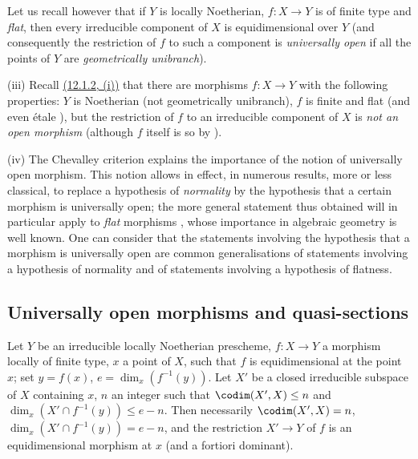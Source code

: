 \begin{remarks}[14.4.10]
Let us recall however  that if $Y$ is locally Noetherian, $f:X\to Y$ is of finite type and \emph{flat}, then every irreducible component of $X$ is equidimensional over $Y$ (and consequently the restriction of $f$ to such a component is \emph{universally open} if all the points of $Y$ are \emph{geometrically unibranch}).

(iii) Recall {\hyperlink{ega4.c04.item.12-1-2}{(12.1.2, (i))}} that there are morphisms $f:X\to Y$ with the following properties: $Y$ is Noetherian (not geometrically unibranch), $f$ is finite and flat (and even \'etale ), but the restriction of $f$ to an irreducible component of $X$ is \emph{not an open morphism} (although $f$ itself is so by ).

(iv) The Chevalley criterion  explains the importance of the notion of universally open morphism.
This notion allows in effect, in numerous results, more or less classical, to replace a hypothesis of \emph{normality} by the hypothesis that a certain morphism is universally open; the more general statement
thus obtained will in particular apply to \emph{flat} morphisms , whose importance in algebraic geometry is well known.
One can consider that the statements involving the hypothesis that a morphism is universally open are common generalisations of statements involving a hypothesis of normality and of statements involving a hypothesis of flatness.
\end{remarks}


\subsection{Universally open morphisms and quasi-sections}
\label{subsection:IV.14.5}
\label{IV.14.5}

\begin{lemma}[14.5.1]
\label{IV.14.5.1}
Let $Y$ be an irreducible locally Noetherian prescheme, $f:X\to Y$ a morphism locally of finite type, $x$ a point of $X$, such that $f$ is equidimensional  at the point $x$; set $y=f(x)$, $e=\dim_x(f^{-1}(y))$.
Let $X'$ be a closed irreducible subspace of $X$ containing $x$, $n$ an integer such that $\codim(X',X)\leq n$ and $\dim_x(X'\cap f^{-1}(y))\leq e-n$.
Then necessarily $\codim(X',X)=n$, $\dim_x(X'\cap f^{-1}(y))=e-n$, and the restriction $X'\to Y$ of $f$ is an equidimensional morphism at $x$ (and a fortiori dominant).
\end{lemma}

